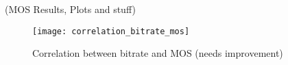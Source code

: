 (MOS Results, Plots and stuff)

\begin{figure}[!t]
	\centering
	\texttt{[image: correlation\_bitrate\_mos]}
	\caption{Correlation between bitrate and MOS (needs improvement)}
	\label{fig:result:correlation_bitrate_mos}
\end{figure}

